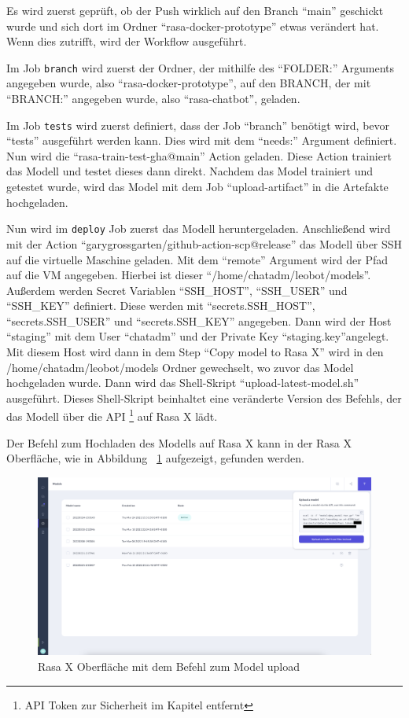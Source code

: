 Es wird zuerst geprüft, ob der Push wirklich auf den Branch ``main'' geschickt wurde und sich dort im Ordner ``rasa-docker-prototype'' etwas verändert hat.
Wenn dies zutrifft, wird der Workflow ausgeführt.

Im Job \texttt{branch} wird zuerst der Ordner, der mithilfe des ``FOLDER:'' Arguments angegeben wurde, also ``rasa-docker-prototype'', auf den BRANCH, der mit ``BRANCH:'' angegeben wurde, also ``rasa-chatbot'', geladen.

Im Job \texttt{tests} wird zuerst definiert, dass der Job ``branch'' benötigt wird, bevor ``tests'' ausgeführt werden kann.
Dies wird mit dem ``needs:'' Argument definiert.
Nun wird die ``rasa-train-test-gha@main'' Action geladen.
Diese Action trainiert das Modell und testet dieses dann direkt.
Nachdem das Model trainiert und getestet wurde, wird das Model mit dem Job ``upload-artifact'' in die Artefakte hochgeladen.

Nun wird im \texttt{deploy} Job zuerst das Modell heruntergeladen.
Anschließend wird mit der Action ``garygrossgarten/github-action-scp@release'' das Modell über SSH auf die virtuelle Maschine geladen.
Mit dem ``remote'' Argument wird der Pfad auf die VM angegeben.
Hierbei ist dieser ``/home/chatadm/leobot/models''.
Außerdem werden Secret Variablen ``SSH\_HOST'', ``SSH\_USER'' und ``SSH\_KEY'' definiert.
Diese werden mit ``secrets.SSH\_HOST'', ``secrets.SSH\_USER'' und ``secrets.SSH\_KEY'' angegeben.
Dann wird der Host ``staging'' mit dem User ``chatadm'' und der Private Key ``staging.key''angelegt.
Mit diesem Host wird dann in dem Step ``Copy model to Rasa X'' wird in den /home/chatadm/leobot/models Ordner gewechselt, wo zuvor das Model hochgeladen wurde.
Dann wird das Shell-Skript ``upload-latest-model.sh'' ausgeführt.
Dieses Shell-Skript beinhaltet eine veränderte Version des Befehls, der das Modell über die API \footnote{API Token zur Sicherheit im Kapitel entfernt} auf Rasa X lädt.

Der Befehl zum Hochladen des Modells auf Rasa X kann in der Rasa X Oberfläche, wie in Abbildung ~\ref{fig:impl:rasaxapimodel} aufgezeigt, gefunden werden.

\begin{figure}[hbt!]
    \centering
    \includegraphics[scale=0.2]{pics/rasaxapimodel}
    \caption{Rasa X Oberfläche mit dem Befehl zum Model upload}
    \label{fig:impl:rasaxapimodel}
\end{figure}

